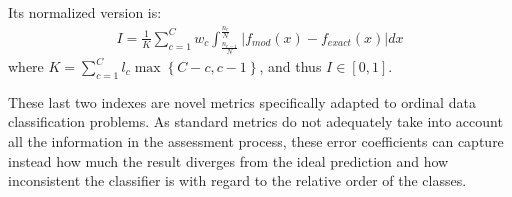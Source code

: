 Its normalized version is:
\begin{equation}
    \label{eq:Ball}
    \begin{aligned}
        I = \frac{1}{K}\sum_{c=1}^{C} w_{c} \int_{\frac{n_{c-1}}{N}}^{\frac{n_{c}}{N}} |f_{mod}(x)-f_{exact}(x)|dx
    \end{aligned}
\end{equation}
where \(K=\sum_{c=1}^{C} l_c \max \left\{ C-c,c-1\right\}\), and thus \(I \in [0,1]\).

These last two indexes are novel metrics specifically adapted to ordinal data classification problems.
As standard metrics do not adequately take into account all the information in the assessment process, these error coefficients can capture instead how much the result diverges from the
ideal prediction and how inconsistent the classifier is with regard to the relative order of the classes.

